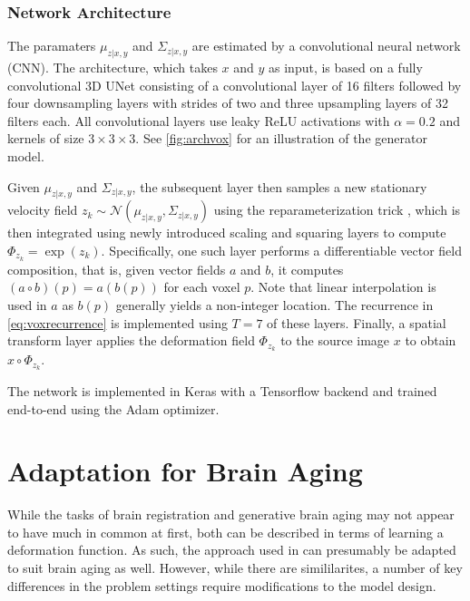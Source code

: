 \subsubsection*{Network Architecture}
The paramaters $\mu_{z | x, y}$ and $\Sigma_{z | x, y}$ are estimated by a convolutional neural network (CNN). The architecture, which takes $x$ and $y$ as input, is based on a fully convolutional 3D UNet consisting of a convolutional layer of 16 filters followed by four downsampling layers with strides of two and three upsampling layers of 32 filters each. All convolutional layers use leaky ReLU activations with $\alpha = 0.2$ and kernels of size $3\times3\times3$. See \autoref{fig:archvox} for an illustration of the generator model.

\begin{figure}
	\centering
	
	\caption{}
	\label{fig:archvox}
\end{figure}

Given $\mu_{z | x, y}$ and $\Sigma_{z | x, y}$, the subsequent layer then samples a new stationary velocity field $ { z_k \sim \mathcal{N}(\mu_{z | x, y}, \Sigma_{z | x, y}) } $ using the reparameterization trick \cite{kingma2013auto}, which is then integrated using newly introduced scaling and squaring layers to compute $\Phi_{z_k} = \exp(z_k)$. Specifically, one such layer performs a differentiable vector field composition, that is, given vector fields $a$ and $b$, it computes $(a \circ b)(p) = a(b(p))$ for each voxel $p$. Note that linear interpolation is used in $a$ as $b(p)$ generally yields a non-integer location. The recurrence in \autoref{eq:voxrecurrence} is implemented using $T = 7$ of these layers. Finally, a spatial transform layer applies the deformation field $\Phi_{z_k}$ to the source image $x$ to obtain $x \circ \Phi_{z_k}$.

The network is implemented in Keras with a Tensorflow backend and trained end-to-end using the Adam \cite{kingma2014adam} optimizer.

\section{Adaptation for Brain Aging}
While the tasks of brain registration and generative brain aging may not appear to have much in common at first, both can be described in terms of learning a deformation function. As such, the approach used in \cite{balakrishnan2019voxelmorph} can presumably be adapted to suit brain aging as well. However, while there are simililarites, a number of key differences in the problem settings require modifications to the model design.

